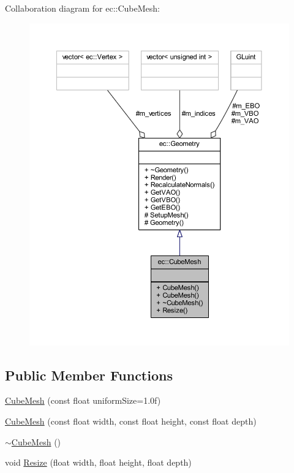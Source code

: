 Collaboration diagram for ec\+:\+:Cube\+Mesh\+:\nopagebreak
\begin{figure}[H]
\begin{center}
\leavevmode
\includegraphics[width=350pt]{classec_1_1_cube_mesh__coll__graph}
\end{center}
\end{figure}
\subsection*{Public Member Functions}
\begin{DoxyCompactItemize}
\item 
\mbox{\hyperlink{classec_1_1_cube_mesh_ac7a03d63c5e3f57ef94e5d18098b4a03}{Cube\+Mesh}} (const float uniform\+Size=1.\+0f)
\item 
\mbox{\hyperlink{classec_1_1_cube_mesh_a645d007818631c7ab01c4725ec6818a6}{Cube\+Mesh}} (const float width, const float height, const float depth)
\item 
\mbox{\hyperlink{classec_1_1_cube_mesh_a59af4189ee0c7fa24e2bd239acc6589d}{$\sim$\+Cube\+Mesh}} ()
\item 
void \mbox{\hyperlink{classec_1_1_cube_mesh_a4c2538e7fa1de0ea96c794ae3bc6e1d7}{Resize}} (float width, float height, float depth)
\end{DoxyCompactItemize}
